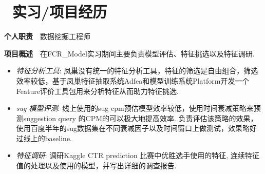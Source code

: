 \documentclass[13pt,a4paper]{resume}
\begin{document}
\section{\faUsers\ 实习/项目经历}
\textbf{个人职责}\ \ 数据挖掘工程师
\newline
\begin{onehalfspacing}
\textbf{项目概述}\ \ 在FCR\_Model实习期间主要负责模型评估、特征挑选以及特征调研.
\begin{itemize}
  \item {\emph{特征分析工具}}: 凤巢没有统一的特征分析工具，特征的筛选是自由组合，筛选效率较低，基于凤巢特征抽取系统Adfea和模型训练系统Platform开发一个Feature评价工具包用来分析特征从而助力特征挑选.
  \item {\emph{sug 模型评测}}: 线上使用的sug cpm预估模型效率较低，使用时间衰减策略来预测suggestion query 的CPM的可以极大地提高效率. 负责评估该策略的效果，使用百度半年的sug数据集在不同衰减因子以及时间窗口上做测试，效果略好过线上的baseline.
  \item {\emph{特征调研}}: 调研Kaggle CTR prediction 比赛中优胜选手使用的特征, 连续特征值的处理以及使用的模型，并写出详细的调查报告.
\end{itemize}
\end{onehalfspacing}
\end{document}
